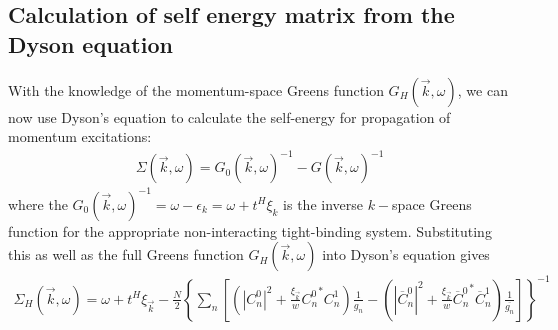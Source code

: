 \documentclass[12pt]{article}
\numberwithin{equation}{section}
\begin{document}
\subsection{Calculation of self energy matrix from the Dyson equation}
With the knowledge of the momentum-space Greens function $G_H(\vec k, \omega)$, we can now use Dyson's equation to calculate the self-energy for propagation of momentum excitations:
\begin{equation}\begin{aligned}
	\Sigma(\vec k,\omega) = G_0(\vec k,\omega)^{-1} - G(\vec k,\omega)^{-1}
\end{aligned}\end{equation}
where the $G_{0}(\vec k, \omega)^{-1}  = \omega -\epsilon_{k} = \omega +t^{H}\xi_{k}$ is the inverse $k-$space Greens function for the appropriate non-interacting tight-binding system. Substituting this as well as the full Greens function $G_H(\vec k, \omega)$ into Dyson's equation gives
\begin{equation}\begin{aligned}
	\Sigma_H(\vec k,\omega) = \omega +t^{H}\xi_{\vec k} - \frac{N}{2}\left\{\sum_n\left[\left(|C^0_{n}|^2 + \frac{\xi_{\vec{k}}}{w}{C^0_{n}}^* C^1_{n} \right)\frac{1}{g_n} - \left(|\overline C^0_{n}|^2 + \frac{\xi_{\vec{k}}}{w}{\overline C^0_{n}}^* \overline C^1_{n}\right)\frac{1}{\overline{g_n}}\right]\right\}^{-1}
\end{aligned}\end{equation}
\end{document}
